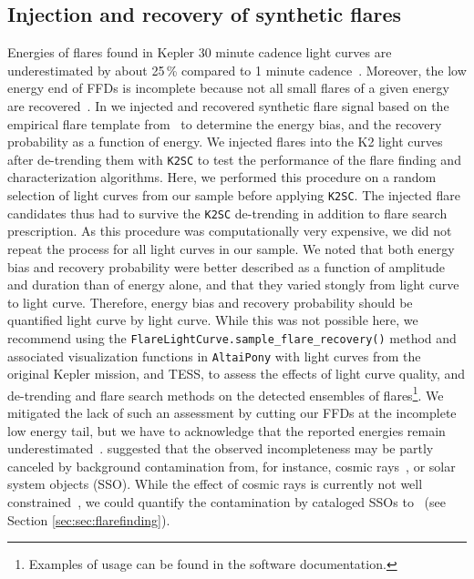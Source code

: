 \documentclass{aa}
\begin{document}
\subsection{Injection and recovery of synthetic flares}
\label{sec:sec:injrec}
Energies of flares found in Kepler 30 minute cadence light curves are underestimated by about 25\,\% compared to 1 minute cadence~\citep{yang_flaresampling_2018}. Moreover, the low energy end of FFDs is incomplete because not all small flares of a given energy are recovered~\citep{davenport_kepler_2016}. In  we injected and recovered synthetic flare signal based on the empirical flare template from~\citet{davenport_kepler_2014} to determine the energy bias, and the recovery probability as a function of energy. We injected flares into the K2 light curves after de-trending them with \texttt{K2SC} to test the performance of the flare finding and characterization algorithms. Here, we performed this procedure on a random selection of light curves from our sample before applying \texttt{K2SC}. The injected flare candidates thus had to survive the \texttt{K2SC} de-trending in addition to flare search prescription. As this procedure was computationally very expensive, we did not repeat the process for all light curves in our sample. We noted that both energy bias and recovery probability were better described as a function of amplitude and duration than of energy alone, and that they varied stongly from light curve to light curve. Therefore, energy bias and recovery probability should be quantified light curve by light curve. While this was not possible here, we recommend using the \texttt{FlareLightCurve.sample\_flare\_recovery()} method and associated visualization functions in \texttt{AltaiPony} with light curves from the original Kepler mission, and TESS, to assess the effects of light curve quality, and de-trending and flare search methods on the detected ensembles of flares\footnote{Examples of usage can be found in the software documentation.}. We mitigated the lack of such an assessment by cutting our FFDs at the incomplete low energy tail, but we have to acknowledge that the reported energies remain underestimated~\citep{yang_flaresampling_2018}. \citet{aschwanden_powerlaws_2015} suggested that the observed incompleteness may be partly canceled by background contamination from, for instance, cosmic rays~, or solar system objects (SSO). While the effect of cosmic rays is currently not well constrained~, we could quantify the contamination by cataloged SSOs to ~(see Section \ref{sec:sec:flarefinding}).
\end{document}
